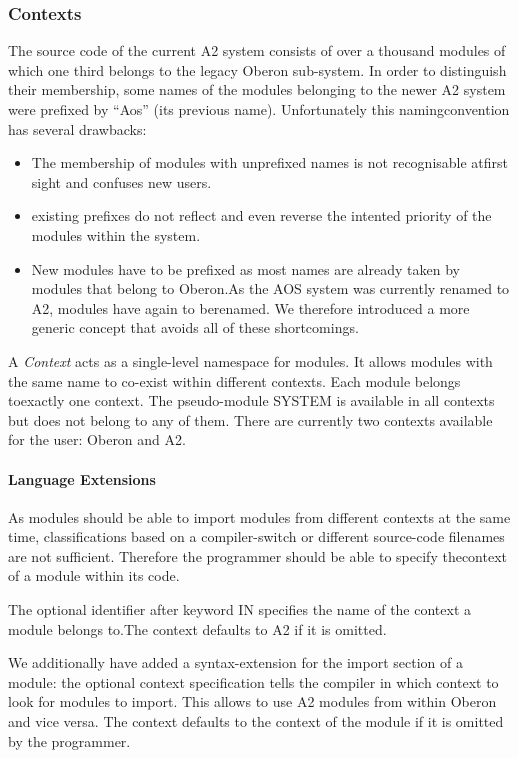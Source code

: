 \documentclass[a4wide,11pt]{article}
\begin{document}
\begin{annotation}
\subsubsection{Contexts}\label{rationale: contexts}
The source code of the current A2 system consists of over a thousand modules of which one third belongs to the legacy Oberon sub-system.
In order to distinguish their membership, some names of the modules belonging to the newer A2 system were prefixed by “Aos” (its previous name).
Unfortunately this namingconvention has several drawbacks:
\begin{itemize}
\item The membership of modules with unprefixed names is not recognisable atfirst sight and confuses new users.
\item existing prefixes do not reflect and even reverse the intented priority of the modules within the system.
\item New  modules  have  to  be  prefixed  as  most  names  are  already  taken  by modules that belong to Oberon.As the AOS system was currently renamed to A2, modules have again to berenamed.
We therefore introduced a more generic concept that avoids all of these shortcomings.
\end{itemize}

A \emph{Context} acts as a single-level namespace for modules.
It allows modules with the same name to co-exist within different contexts.
Each module belongs toexactly one context.
The pseudo-module SYSTEM is available in all contexts but does not belong to any of them.
There are currently two contexts available for the user: Oberon and A2.

\paragraph{Language Extensions} As  modules  should  be  able  to  import  modules  from  different  contexts  at  the same time, classifications based on a compiler-switch or different source-code filenames are not sufficient.
Therefore the programmer should be able to specify thecontext of a module within its code.

The optional identifier after keyword IN specifies the name of the context a module belongs to.The context defaults to A2 if it is omitted.

We additionally have added a syntax-extension for the import section of a module: the optional context specification tells the compiler in which context to look for modules to import.
This allows to use A2 modules from within Oberon and vice versa.
The context defaults to the context of the module if it is omitted by the programmer.


\end{annotation}
\end{document}
